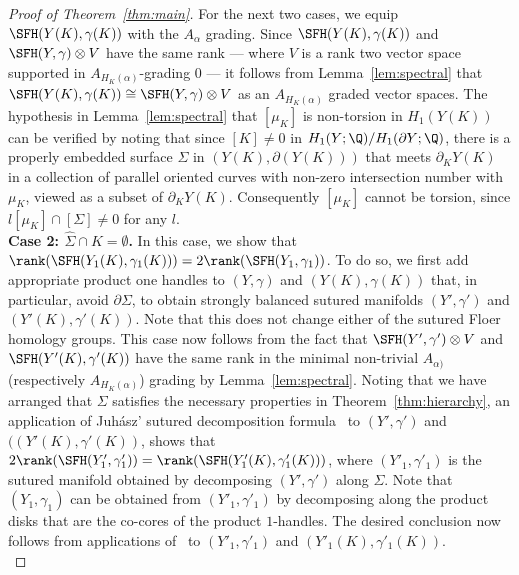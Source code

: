 \documentclass{amsart}
\theoremstyle{definition}
\theoremstyle{remark}
\numberwithin{equation}{section}
\begin{document}
\begin{proof}[Proof of Theorem~\ref{thm:main}]
For the next two cases, we equip $\SFH(Y(K),\gamma(K))$ with the $A_{\alpha}$ grading. Since $\SFH(Y(K),\gamma(K))$ and ${\SFH(Y,\gamma)\otimes V}$ have the same rank --- where $V$ is a rank two vector space supported in $A_{H_K(\alpha)}$-grading $0$ --- it follows from Lemma~\ref{lem:spectral} that $\SFH(Y(K),\gamma(K))\cong \SFH(Y,\gamma)\otimes V$ as an $A_{H_K(\alpha)}$ graded vector spaces. The hypothesis in Lemma~\ref{lem:spectral} that $[\mu_K]$ is non-torsion in $H_1(Y(K))$ can be verified by noting that since $[K]\neq 0$ in $H_1(Y;\Q)/H_1(\partial Y;\Q)$, there is a properly embedded surface $\Sigma$ in $(Y(K),\partial(Y(K)))$ that meets $\partial_K Y(K)$ in a collection of parallel oriented curves with non-zero intersection number with $\mu_K$, viewed as a subset of $\partial_KY(K)$. Consequently $[\mu_K]$ cannot be torsion, since $l[\mu_K]\cap [\Sigma]\neq 0$ for any $l$.\\

\noindent\textbf{Case 2: $\widehat{\Sigma}\cap K=\emptyset$.} In this case, we show that $\rank(\SFH(Y_1(K),\gamma_1(K)))=2\rank(\SFH(Y_1,\gamma_1))$. To do so, we first add appropriate product one handles to $(Y,\gamma)$ and $(Y(K),\gamma(K))$ that, in particular, avoid $\partial \Sigma$, to obtain strongly balanced sutured manifolds $(Y',\gamma')$ and $(Y'(K),\gamma'(K))$. Note that this does not change either of the sutured Floer homology groups. This case now follows from the fact that $\SFH(Y',\gamma')\otimes V$ and $\SFH(Y'(K),\gamma'(K))$ have the same rank in the minimal non-trivial $A_{\alpha)}$ (respectively $A_{H_K(\alpha)}$) grading by Lemma~\ref{lem:spectral}. Noting that we have arranged that $\Sigma$ satisfies the necessary properties in Theorem~\ref{thm:hierarchy}, an application of Juh\'asz' sutured decomposition formula~\cite[Theorem 1.3]{juhasz2008floer} to $(Y',\gamma')$ and $((Y'(K),\gamma'(K))$, shows that $2\rank(\SFH(Y'_1,\gamma'_1))=\rank(\SFH(Y'_1(K),\gamma'_1(K)))$, where $(Y'_1,\gamma'_1)$ is the sutured manifold obtained by decomposing $(Y',\gamma')$ along $\Sigma$. Note that $(Y_1,\gamma_1)$ can be obtained from $(Y'_1,\gamma'_1)$ by decomposing along the product disks that are the co-cores of the product $1$-handles. The desired conclusion now follows from applications of~\cite[Lemma 9.11]{juhasz2006holomorphic} to $(Y'_1,\gamma'_1)$ and $(Y'_1(K),\gamma'_1(K))$.\\




\end{proof}
\end{document}
